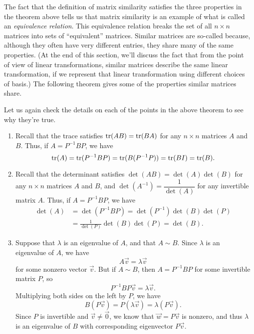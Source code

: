 The fact that the definition of matrix similarity satisfies the three properties in the theorem above tells us that matrix similarity is an example of what is called an \textit{equivalence relation}. This equivalence relation breaks the set of all $n\times n$ matrices into sets of ``equivalent'' matrices.  Similar matrices are so-called because, although they often have very different entries, they share many of the same properties. (At the end of this section, we'll discuss the fact that from the point of view of linear transformations, similar matrices describe the same linear transformation, if we represent that linear transformation using different choices of basis.) The following theorem gives some of the properties similar matrices share.

\smallskip


\smallskip

Let us again check the details on each of the points in the above theorem to see why they're true.
 \begin{enumerate}
  \item Recall that the trace satisfies $\operatorname{tr}(AB) = \operatorname{tr}(BA)$ for any $n\times n$ matrices $A$ and $B$. Thus, if $A = P^{-1}BP$, we have
\[
 \operatorname{tr}(A) = \operatorname{tr}(P^{-1}BP) = \operatorname{tr}(B(P^{-1}P)) = \operatorname{tr}(BI)=\operatorname{tr}(B).
\]
 \item Recall that the determinant satisfies $\det(AB) = \det(A)\det(B)$ for any $n\times n$ matrices $A$ and $B$, and $\det(A^{-1}) = \dfrac{1}{\det(A)}$ for any invertible matrix $A$. Thus, if $A = P^{-1}BP$, we have
\begin{align*}
 \det(A) &= \det(P^{-1}BP) = \det(P^{-1})\det(B)\det(P)\\
 & = \frac{1}{\det(P)}\det(B)\det(P) = \det(B).
\end{align*}
 \item Suppose that $\lambda$ is an eigenvalue of $A$, and that $A\sim B$. Since $\lambda$ is an eigenvalue of $A$, we have
\[
 A\vec{v} = \lambda\vec{v}
\]
for some nonzero vector $\vec{v}$. But if $A\sim B$, then $A = P^{-1}BP$ for some invertible matrix $P$, so 
\[
 P^{-1}BP\vec{v} = \lambda\vec{v}.
\]
Multiplying both sides on the left by $P$, we have
\[
 B(P\vec{v}) = P(\lambda\vec{v}) = \lambda(P\vec{v}).
\]
Since $P$ is invertible and $\vec{v}\neq \vec{0}$, we know that $\vec{w} = P\vec{v}$ is nonzero, and thus $\lambda$ is an eigenvalue of $B$ with corresponding eigenvector $P\vec{v}$.
 \end{enumerate}


